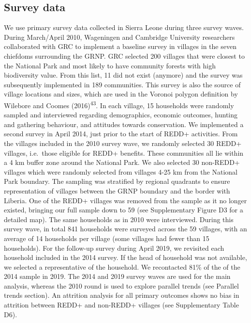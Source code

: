 \documentclass[
]{article}
\begin{document}
\hypertarget{survey-data}{%
\subsection{Survey data}\label{survey-data}}

We use primary survey data collected in Sierra Leone during three survey
waves. During March/April 2010, Wageningen and Cambridge University
researchers collaborated with GRC to implement a baseline survey in
villages in the seven chiefdoms surrounding the GRNP. GRC selected 200
villages that were closest to the National Park and most likely to have
community forests with high biodiversity value. From this list, 11 did
not exist (anymore) and the survey was subsequently implemented in 189
communities. This survey is also the source of village locations and
sizes, which are used in the Voronoi polygon definition by Wilebore and
Coomes (2016)\textsuperscript{43}. In each village, 15 households were
randomly sampled and interviewed regarding demographics, economic
outcomes, hunting and gathering behaviour, and attitudes towards
conservation. We implemented a second survey in April 2014, just prior
to the start of REDD+ activities. From the villages included in the 2010
survey wave, we randomly selected 30 REDD+ villages, i.e.~those eligible
for REDD+ benefits. These communities all lie within a 4 km buffer zone
around the National Park. We also selected 30 non-REDD+ villages which
were randomly selected from villages 4-25 km from the National Park
boundary. The sampling was stratified by regional quadrants to ensure
representation of villages between the GRNP boundary and the border with
Liberia. One of the REDD+ villages was removed from the sample as it no
longer existed, bringing our full sample down to 59 (see Supplementary
Figure D3 for a detailed map). The same households as in 2010 were
interviewed. During this survey wave, in total 841 households were
surveyed across the 59 villages, with an average of 14 households per
village (some villages had fewer than 15 households). For the follow-up
survey during April 2019, we revisited each household included in the
2014 survey. If the head of household was not available, we selected a
representative of the household. We recontacted 81\% of the of the 2014
sample in 2019. The 2014 and 2019 survey waves are used for the main
analysis, whereas the 2010 round is used to explore parallel trends (see
Parallel trends section). An attrition analysis for all primary outcomes
shows no bias in attrition between REDD+ and non-REDD+ villages (see
Supplementary Table D6).
\end{document}
